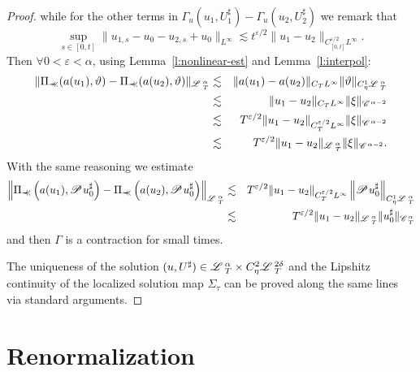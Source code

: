\documentclass[11pt,reqno]{amsart}
\newcommand{\precprec}{\prec\!\!\!\prec}
\newcommand{\CC}{\mathscr{C} \hspace{.1em}}
\newcommand{\LL}{\mathscr{L} \hspace{.2em}}
\newcommand{\PP}{\mathscr{P} \hspace{.1em}}
\begin{document}
\begin{proof}
  while for the other terms in $\Gamma_u (u_1, U^{\sharp}_1) - \Gamma_u (u_2,
  U^{\sharp}_2)$ we remark that
  \[ \sup_{s \in [0, t]} \| u_{1, s} - u_0 - u_{2, s} + u_0 \|_{L^{\infty}}
     \lesssim t^{\varepsilon / 2} \| u_1 - u_2 \|_{C_{[0, t]}^{\varepsilon /
     2} L^{\infty}} . \]
  Then $\forall 0 < \varepsilon < \alpha$, using Lemma~\ref{l:nonlinear-est}
  and Lemma~\ref{l:interpol}:
  \begin{eqnarray*}
    \| \Pi_{\precprec} (a (u_1), \vartheta) - \Pi_{\precprec} (a (u_2),
    \vartheta) \|_{\LL^{\alpha}_T} & \lesssim & \| a (u_1) - a (u_2) \|_{C_T
    L^{\infty}} \| \vartheta \|_{C_{\eta}^1 \LL^{\alpha}_T}\\
    & \lesssim & \| u_1 - u_2 \|_{C_T L^{\infty}} \| \xi \|_{\CC^{\alpha -
    2}}\\
    & \lesssim & T^{\varepsilon / 2}  \| u_1 - u_2 \|_{C_T^{\varepsilon / 2}
    L^{\infty}} \| \xi \|_{\CC^{\alpha - 2}} \\
    & \lesssim & T^{\varepsilon / 2} \| u_1 - u_2 \|_{\LL^{\alpha}_T} \| \xi
    \|_{\CC^{\alpha - 2}} .
  \end{eqnarray*}
  With the same reasoning we estimate
  \begin{eqnarray*}
    \left\| \Pi_{\precprec} \left( a (u_1), \PP u^{\sharp}_0 \right) -
    \Pi_{\precprec} \left( a (u_2), \PP u^{\sharp}_0 \right)
    \right\|_{\LL^{\alpha}_T} & \lesssim & T^{\varepsilon / 2} \| u_1 - u_2
    \|_{C^{\varepsilon / 2}_T L^{\infty}} \left\| \PP u^{\sharp}_0
    \right\|_{C_{\eta}^1 \LL^{\alpha}_T}\\
    & \lesssim & T^{\varepsilon / 2} \| u_1 - u_2 \|_{\LL^{\alpha}_T} \|
    u^{\sharp}_0 \|_{\CC^{\alpha}_T}
  \end{eqnarray*}
  and then $\Gamma$ is a contraction for small times.
  
  The uniqueness of the solution $(u, U^{\sharp}) \in \LL^{\alpha}_T \times
  C_{\eta}^2 \LL^{2 \delta}_T$ and the Lipshitz continuity of the localized
  solution map $\Sigma_{\tau}$ can be proved along the same lines via standard
  arguments.
\end{proof}

\section{Renormalization\label{s:renorm}}
\end{document}
